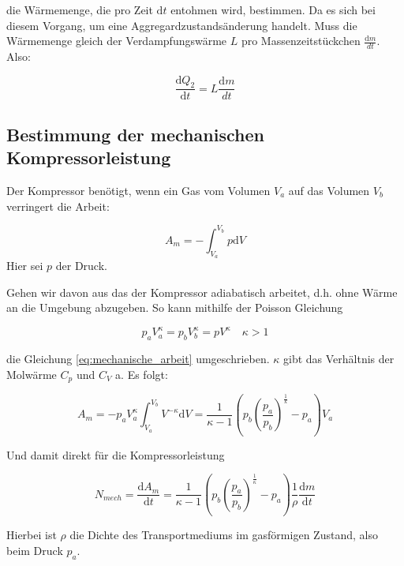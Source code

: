 die Wärmemenge, die pro Zeit $\mathup{d}t$ entohmen wird, bestimmen.
Da es sich bei diesem Vorgang, um eine Aggregardzustandsänderung handelt.
Muss die Wärmemenge gleich der Verdampfungswärme $L$ pro Massenzeitstückchen $\frac{\mathup{d}m}{dt}$.
Also:

\begin{equation*}
\frac{\mathup{d} Q_2}{\mathup{d} t}=L\frac{\mathup{d}m}{dt}
\end{equation*}

\subsection{Bestimmung der mechanischen Kompressorleistung}

Der Kompressor benötigt, wenn ein Gas vom Volumen $V_a$ auf das Volumen $V_b$ verringert
die Arbeit:

\begin{equation}
\label{eq:mechanische_arbeit}
A_m=-\int_{V_a}^{V_b}p\mathup{d}V
\end{equation}
Hier sei $p$ der Druck.

Gehen wir davon aus das der Kompressor adiabatisch arbeitet,
d.h. ohne Wärme an die Umgebung abzugeben. 
So kann mithilfe der Poisson Gleichung

\begin{equation*}
p_aV^{\kappa}_a=p_bV^{\kappa}_b=pV^{\kappa} \quad \kappa>1
\end{equation*}

die Gleichung \eqref{eq:mechanische_arbeit} umgeschrieben.
$\kappa$ gibt das Verhältnis der Molwärme $C_p$ und $C_V$ a.
Es folgt:

\begin{equation*}
A_m=-p_aV_a^{\kappa}\int_{V_a}^{V_b}V^{-\kappa}\mathup{d}V=\frac{1}{\kappa-1}\left(p_b\left(\frac{p_a}{p_b}\right)^{\frac{1}{k}}-p_a\right)V_a
\end{equation*}

Und damit direkt für die Kompressorleistung

\begin{equation*}
N_{mech}=\frac{\mathup{d}A_m}{\mathup{d}t}=\frac{1}{\kappa-1}\left(p_b\left(\frac{p_a}{p_b}\right)^{\frac{1}{\kappa}}-p_a\right)\frac{1}{\rho}\frac{\mathup{d}m}{\mathup{d}t}
\end{equation*}

Hierbei ist $\rho$ die Dichte des Transportmediums im gasförmigen Zustand, also beim Druck $p_a$.



